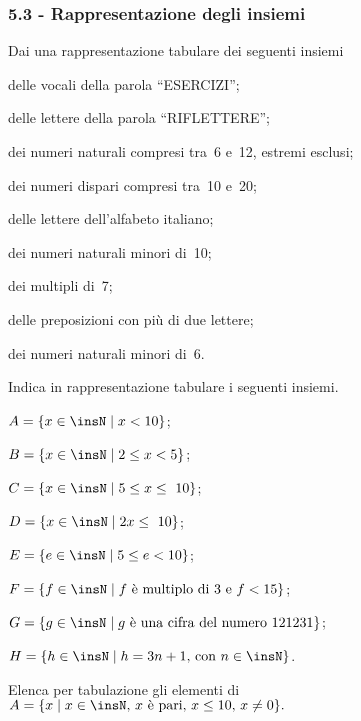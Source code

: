 \subsubsection*{5.3 - Rappresentazione degli insiemi}

\begin{esercizio}
\label{ese:5.15}
Dai una rappresentazione tabulare dei seguenti insiemi
\begin{enumeratea}
 \item delle vocali della parola ``ESERCIZI'';
 \item delle lettere della parola ``RIFLETTERE'';
 \item dei numeri naturali compresi tra~6 e~12, estremi esclusi;
 \item dei numeri dispari compresi tra~10 e~20;
 \item delle lettere dell'alfabeto italiano;
 \item dei numeri naturali minori di~10;
 \item dei multipli di~7;
 \item delle preposizioni con più di due lettere;
 \item dei numeri naturali minori di~6.
\end{enumeratea}
\end{esercizio}

\begin{esercizio}[\Ast]
 \label{ese:5.16}
Indica in rappresentazione tabulare i seguenti insiemi.
\TabPositions{7.5cm}
\begin{enumeratea}
 \item $A=\{x\in\insN\mid x<10\}$; %
 \item $B=\{x\in\insN\mid 2\le x<5\}$; %
 \item $C=\{x\in\insN\mid 5\le x\le~10\}$; %
 \item $D=\{x\in\insN\mid 2x\le~10\}$; %
 \item $E=\{e\in\insN\mid 5\le e<10\}$; %
 \item $F=\{f\in\insN\mid f\text{ è multiplo di~3 e } f<15\}$; %
 \item $G=\{g\in\insN\mid g\text{ è una cifra del numero }121231\}$; %
 \item $H=\{h\in\insN\mid h=3n+1\text{, con }n\in\insN\}$. %
\end{enumeratea}
\end{esercizio}

\begin{esercizio}
\label{ese:5.17}
Elenca per tabulazione gli elementi di~$A=\{x\mid x\in\insN\text{, }x\text{ è pari, }x\leq10\text{, }x\neq0\}.$
\end{esercizio}

